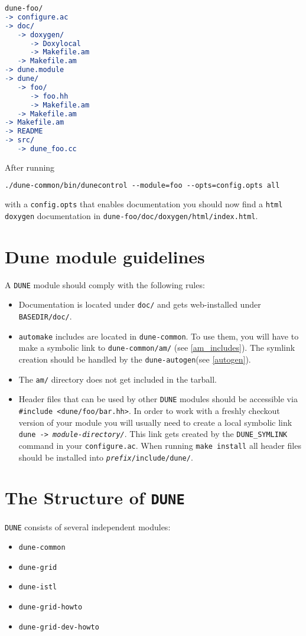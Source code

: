 \documentclass[11pt,a4paper,headinclude,footinclude,DIV16,normalheadings]{scrartcl}
\newcommand{\dune}{\texttt{DUNE}\xspace}
\newcommand{\automake}{\texttt{automake}\xspace}
\newcommand{\autogen}{\texttt{dune-autogen}\xspace}
\newcommand{\configureac}{\texttt{configure.ac}\xspace}
\newcommand{\dunecommon}{\texttt{dune-common}\xspace}
\newcommand{\duneistl}{\texttt{dune-istl}\xspace}
\newcommand{\dunegrid}{\texttt{dune-grid}\xspace}
\newcommand{\dunegridhowto}{\texttt{dune-grid-howto}\xspace}
\newcommand{\dunegriddevhowto}{\texttt{dune-grid-dev-howto}\xspace}
\begin{document}
\begin{lstlisting}[language=make]
dune-foo/
-> configure.ac
-> doc/
   -> doxygen/
      -> Doxylocal
      -> Makefile.am
   -> Makefile.am
-> dune.module
-> dune/
   -> foo/
      -> foo.hh
      -> Makefile.am
   -> Makefile.am
-> Makefile.am
-> README
-> src/
   -> dune_foo.cc
\end{lstlisting}

After running
\begin{lstlisting}[language=make]
./dune-common/bin/dunecontrol --module=foo --opts=config.opts all
\end{lstlisting}
with a \texttt{config.opts} that enables documentation you should now find a
\texttt{html} \texttt{doxygen} documentation in
\texttt{dune-foo/doc/doxygen/html/index.html}.\\

\section{Dune module guidelines}\label{section::dune_module_guidelines}
\label{guidelines}

A \dune module should comply with the following rules:
\begin{itemize}
\item Documentation is located under \texttt{doc/} and gets
  web-installed under \texttt{BASEDIR/doc/}.
\item \automake includes are located in \dunecommon. To use them, you
  will have to make a symbolic link to \texttt{dune-common/am/} (see
  \ref{am_includes}). The symlink creation should be handled by the
  \autogen (see \ref{autogen}).
\item The \texttt{am/} directory does not get included in the tarball.
\item Header files that can be used by other \dune modules should be
  accessible via \verb!#include <dune/foo/bar.hh>!. In order to work
  with a freshly checkout version of your module you will usually need
  to create a local symbolic link \texttt{dune ->
    \textit{module-directory/}}. This link gets created by the
  \texttt{DUNE\_SYMLINK} command in your \configureac. When running
  \texttt{make install} all header files should be installed into
  \texttt{\textit{prefix}/include/dune/}.
\end{itemize}

\section{The Structure of \dune}
\dune consists of several independent modules:
\begin{itemize}
\item \dunecommon
\item \dunegrid
\item \duneistl
\item \dunegridhowto
\item \dunegriddevhowto
\end{itemize}
\end{document}
